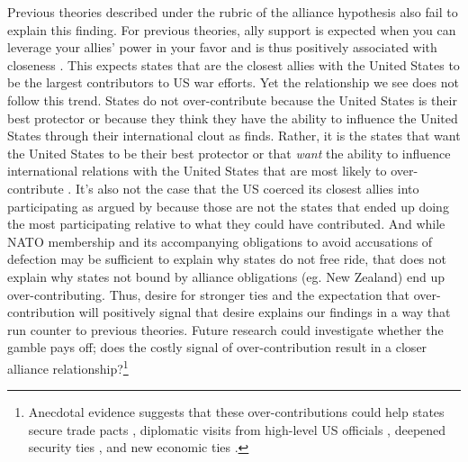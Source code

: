 \documentclass[12pt,letterpaper]{article}
\begin{document}
	Previous theories described under the rubric of the alliance hypothesis also fail to explain this finding. For previous theories, ally support is expected when you can leverage your allies' power in your favor and is thus positively associated with closeness \citep{davidson_neoclassicalrealistexplanation_2011}. This expects states that are the closest allies with the United States to be the largest contributors to US war efforts. Yet the relationship we see does not follow this trend. States do not over-contribute because the United States is their best protector or because they think they have the ability to influence the United States through their international clout as \citet{ringsmose_natoburdensharingredux_2010} finds. Rather, it is the states that want the United States to be their best protector or that \textit{want} the ability to influence international relations with the United States that are most likely to over-contribute \citep{vonhlatky_greatasymmetryamerica_2010}. It's also not the case that the US coerced its closest allies into participating as argued by \citet{kupchan_natopersiangulf_1988} because those are not the states that ended up doing the most participating relative to what they could have contributed. And while NATO membership and its accompanying obligations to avoid accusations of defection may be sufficient to explain why states do not free ride, that does not explain why states not bound by alliance obligations (eg. New Zealand) end up over-contributing. Thus, desire for stronger ties and the expectation that over-contribution will positively signal that desire explains our findings in a way that run counter to previous theories. Future research could investigate whether the gamble pays off; does the costly signal of over-contribution result in a closer alliance relationship?\footnote{Anecdotal evidence suggests that these over-contributions could help states secure trade pacts \citep{armstrong_alliesrewardedtrade_2003}, diplomatic visits from high-level US officials \citep{sanger_meanwhilebackranch_2003}, deepened security ties \citep{whatalliesare_2003}, and new economic ties \citep{whitmore_uswarallies_2003}.}
\end{document}
